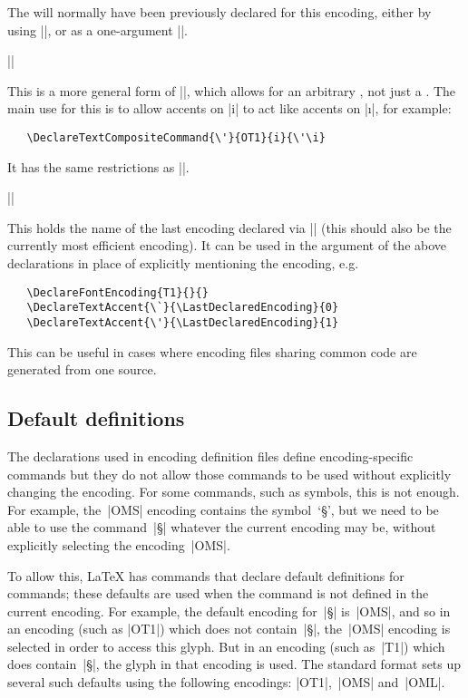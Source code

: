 \documentclass{ltxguide}[1995/11/28]
\begin{document}
The  will normally have been previously declared for this
encoding, either by using |\DeclareTextAccent|, or as a one-argument
|\DeclareTextCommand|.

\begin{decl}[1994/12/01]
  |\DeclareTextCompositeCommand|   
\end{decl}
This is a more general form of |\DeclareTextComposite|, which allows for
an arbitrary , not just a .  The main use for this
is to allow accents on |i| to act like accents on |\i|, for example:
\begin{verbatim}
   \DeclareTextCompositeCommand{\'}{OT1}{i}{\'\i}
\end{verbatim}
It has the same restrictions as |\DeclareTextComposite|.


\begin{decl}[1998/12/01]
  |\LastDeclaredEncoding|
\end{decl}
This holds the name of the last encoding declared via
|\DeclareFontEncoding| (this should also be the currently most efficient
encoding).  It can be used in the  argument of the above
declarations in place of explicitly mentioning the encoding, e.g.
\begin{verbatim}
   \DeclareFontEncoding{T1}{}{}
   \DeclareTextAccent{\`}{\LastDeclaredEncoding}{0}
   \DeclareTextAccent{\'}{\LastDeclaredEncoding}{1}
\end{verbatim}
This can be useful in cases where encoding files sharing common code
are generated from one source.

\subsection{Default definitions}

The declarations used in encoding definition files define
encoding-specific commands but they do not allow those commands to be
used without explicitly changing the encoding.  For some commands, such
as symbols, this is not enough.  For example, the~|OMS| encoding
contains the symbol~`\S', but we need to be able to use the command~|\S|
whatever the current encoding may be, without explicitly selecting the
encoding~|OMS|.

To allow this, \LaTeX{} has commands that declare default definitions
for commands; these defaults are used when the command is not defined in
the current encoding.  For example, the default encoding for~|\S|
is~|OMS|, and so in an encoding (such as |OT1|) which does not
contain~|\S|, the~|OMS| encoding is selected in order to access this
glyph.  But in an encoding (such as~|T1|) which does contain~|\S|, the
glyph in that encoding is used.  The standard \LaTeXe{} format sets up
several such defaults using the following encodings: |OT1|,~|OMS|
and~|OML|.
\end{document}
